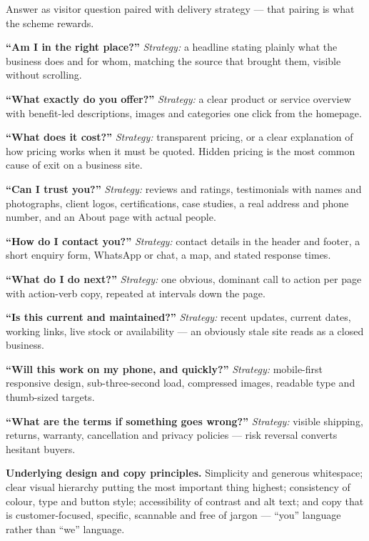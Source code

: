 \begin{qlist}
Answer as visitor question paired with delivery strategy --- that pairing is
what the scheme rewards.
\begin{apts}
\item \textbf{``Am I in the right place?''} \emph{Strategy:} a headline stating
      plainly what the business does and for whom, matching the source that
      brought them, visible without scrolling.
\item \textbf{``What exactly do you offer?''} \emph{Strategy:} a clear product
      or service overview with benefit-led descriptions, images and categories
      one click from the homepage.
\item \textbf{``What does it cost?''} \emph{Strategy:} transparent pricing, or a
      clear explanation of how pricing works when it must be quoted. Hidden
      pricing is the most common cause of exit on a business site.
\item \textbf{``Can I trust you?''} \emph{Strategy:} reviews and ratings,
      testimonials with names and photographs, client logos, certifications,
      case studies, a real address and phone number, and an About page with
      actual people.
\item \textbf{``How do I contact you?''} \emph{Strategy:} contact details in the
      header and footer, a short enquiry form, WhatsApp or chat, a map, and
      stated response times.
\item \textbf{``What do I do next?''} \emph{Strategy:} one obvious, dominant
      call to action per page with action-verb copy, repeated at intervals down
      the page.
\item \textbf{``Is this current and maintained?''} \emph{Strategy:} recent
      updates, current dates, working links, live stock or availability --- an
      obviously stale site reads as a closed business.
\item \textbf{``Will this work on my phone, and quickly?''}
      \emph{Strategy:} mobile-first responsive design, sub-three-second load,
      compressed images, readable type and thumb-sized targets.
\item \textbf{``What are the terms if something goes wrong?''}
      \emph{Strategy:} visible shipping, returns, warranty, cancellation and
      privacy policies --- risk reversal converts hesitant buyers.
\item \textbf{Underlying design and copy principles.} Simplicity and generous
      whitespace; clear visual hierarchy putting the most important thing
      highest; consistency of colour, type and button style; accessibility of
      contrast and alt text; and copy that is customer-focused, specific,
      scannable and free of jargon --- ``you'' language rather than ``we''
      language.
\end{apts}


\end{qlist}
